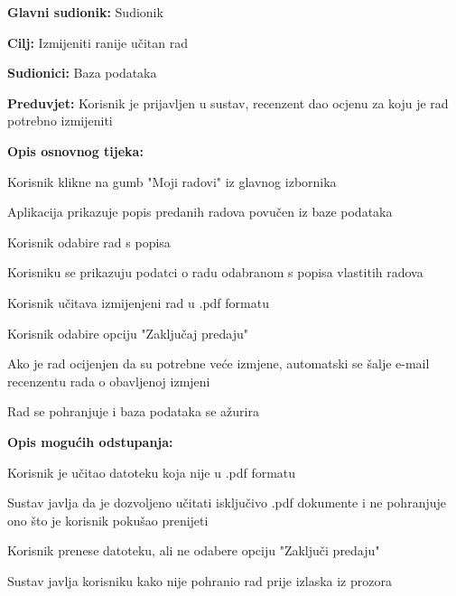 					\begin{packed_item}
						\item \textbf{Glavni sudionik:} Sudionik
						\item \textbf{Cilj:} Izmijeniti ranije učitan rad
						\item \textbf{Sudionici:} Baza podataka
						\item \textbf{Preduvjet:} Korisnik je prijavljen u sustav, recenzent dao ocjenu za koju je rad potrebno izmijeniti
						
						\item \textbf{Opis osnovnog tijeka:} 
						\item[] \begin{packed_enum}
							
							
							\item Korisnik klikne na gumb "Moji radovi" iz glavnog izbornika
							\item Aplikacija prikazuje popis predanih radova povučen iz baze podataka
							\item Korisnik odabire rad s popisa 
							\item  Korisniku se prikazuju podatci o radu odabranom s popisa vlastitih radova
							\item Korisnik učitava izmijenjeni rad u .pdf formatu
							\item Korisnik odabire opciju "Zaključaj predaju"
							\item Ako je rad ocijenjen da su potrebne veće izmjene, automatski se šalje e-mail recenzentu rada o obavljenoj izmjeni
							\item Rad se pohranjuje i baza podataka se ažurira
						\end{packed_enum}
						
						\item \textbf{Opis mogućih odstupanja:}
						\item[] \begin{packed_enum}
							\item[5.a] Korisnik je učitao datoteku koja nije u .pdf formatu
							\item[] \begin{packed_enum}
								\item[1.] Sustav javlja da je dozvoljeno učitati isključivo .pdf dokumente i ne pohranjuje ono što je korisnik pokušao prenijeti
							\end{packed_enum}
							
							\item[6.a] Korisnik prenese datoteku, ali ne odabere opciju "Zaključi predaju"
							\item[] \begin{packed_enum}
								\item[1.] Sustav javlja korisniku kako nije pohranio rad prije izlaska iz prozora
							\end{packed_enum}
							
						\end{packed_enum}
					\end{packed_item}
					
